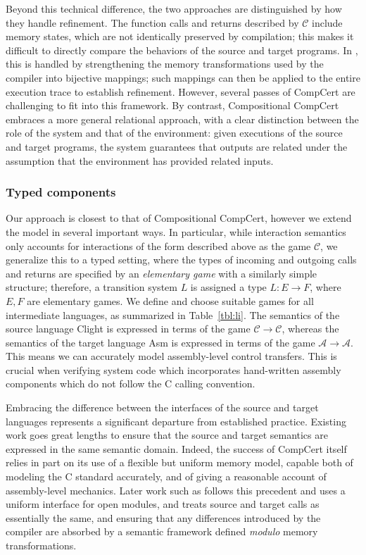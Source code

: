 \documentclass[sigplan,10pt,review,anonymous]{acmart}
\begin{document}
Beyond this technical difference,
the two approaches are distinguished by
how they handle refinement.
The function calls and returns described by $\mathcal{C}$
include memory states,
which are not identically preserved by compilation;
this makes it difficult to directly compare the behaviors
of the source and target programs.
In \cite{cpp15},
this is handled by strengthening the memory transformations
used by the compiler into bijective mappings;
such mappings can then be applied to the entire execution trace
to establish refinement.
However, several passes of CompCert are challenging
to fit into this framework.
By contrast,
Compositional CompCert
embraces a more general relational approach,
with a clear distinction between the role of the system
and that of the environment:
given executions of the source and target programs,
the system guarantees that outputs are related
under the assumption that the environment has provided related inputs.


\subsubsection{Typed components} %

Our approach is closest to that of Compositional CompCert,
however we extend the model in several important ways.
In particular,
while interaction semantics
only accounts for interactions of the form
described above as the game $\mathcal{C}$,
we generalize this to a typed setting,
where the types of incoming and outgoing calls and returns
are specified by an \emph{elementary game}
with a similarly simple structure;
therefore,
a transition system $L$ is assigned a type $L : E \rightarrow F$,
where $E, F$ are elementary games.
We define and choose suitable games
for all intermediate languages,
as summarized in Table~\ref{tbl:li}.
The semantics of the source language Clight
is expressed in terms of the game $\mathcal{C} \rightarrow \mathcal{C}$,
whereas the semantics of the target language Asm
is expressed in terms of the game $\mathcal{A} \rightarrow \mathcal{A}$.
This means we can accurately model assembly-level control transfers.
This is crucial when verifying system code
which incorporates hand-written assembly components
which do not follow the C calling convention.

Embracing the difference between the interfaces of
the source and target languages
represents a significant departure from established practice.
Existing work goes great lengths
to ensure that the source and target semantics
are expressed in the same semantic domain.
Indeed,
the success of CompCert itself
relies in part on its use of a flexible
but uniform memory model,
capable both of modeling the C standard accurately,
and of giving a reasonable account
of assembly-level mechanics.
Later work such as \cite{compcompcert,cpp15}
follows this precedent and uses
a uniform interface for open modules,
and treats source and target calls
as essentially the same,
and ensuring that any differences introduced by the compiler
are absorbed by a semantic framework
defined \emph{modulo} memory transformations.
\end{document}
